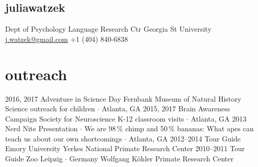 \documentclass[]{friggeri-cv}
\begin{document}


\begin{aside}
  \section{{\normalfont julia}watzek}
    Dept of Psychology
    Language Research Ctr
    Georgia St University
    ~
    \href{mailto:j.watzek@gmail.com}{j.watzek@gmail.com}
    +1 (404) 840-6838
\end{aside}


\section{outreach}

\begin{entrylist}
  \entry
    {2016, 2017}
    {Adventure in Science Day}
    {Fernbank Museum of Natural History}
    {Science outreach for children $\cdot$ Atlanta, GA}
  \entry
    {2015, 2017}
    {Brain Awareness Campaign}
    {Society for Neuroscience}
    {K-12 classroom visits $\cdot$ Atlanta, GA}
  \entry
    {2013}
    {Nerd Nite}
    {}
    {Presentation $\cdot$ We are 98\,\% chimp and 50\,\% bananas: What apes can teach us about our own shortcomings $\cdot$ Atlanta, GA}
  \entry
    {2012--2014}
    {Tour Guide}
    {Emory University}
    {Yerkes National Primate Research Center}
  \entry
    {2010--2011}
    {Tour Guide}
    {Zoo Leipzig $\cdot$ Germany}
    {Wolfgang K\"{o}hler Primate Research Center}
\end{entrylist}


\end{document}
